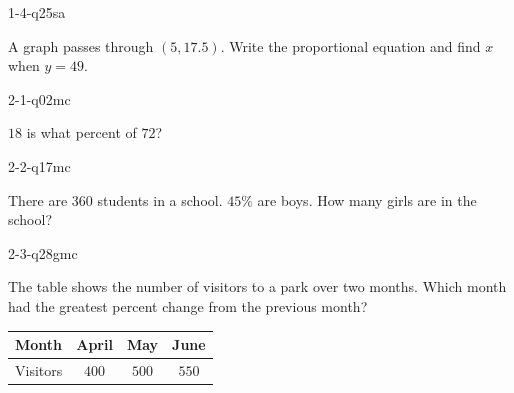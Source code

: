 
\begin{practiceQuestion}{1-4-q25}{sa}
\begin{questionText}
A graph passes through $(5, 17.5)$. Write the proportional equation and find $x$ when $y = 49$.
\end{questionText}
\end{practiceQuestion}

\begin{practiceQuestion}{2-1-q02}{mc}
\begin{questionText}
$18$ is what percent of $72$?
\end{questionText}
\end{practiceQuestion}

\begin{practiceQuestion}{2-2-q17}{mc}
\begin{questionText}
There are $360$ students in a school. $45\%$ are boys. How many girls are in the school?
\end{questionText}
\end{practiceQuestion}

\begin{practiceQuestion}{2-3-q28}{gmc}
\begin{questionText}
The table shows the number of visitors to a park over two months. Which month had the greatest percent change from the previous month?

\begin{center}
\begin{tabular}{|l|c|c|c|}
\hline
\textbf{Month} & \textbf{April} & \textbf{May} & \textbf{June} \\
\hline
Visitors & $400$ & $500$ & $550$ \\
\hline
\end{tabular}
\end{center}
\end{questionText}
\end{practiceQuestion}

